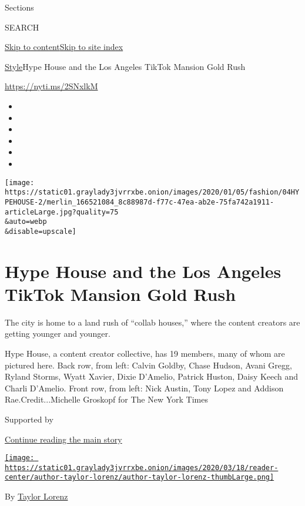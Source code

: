 Sections

SEARCH

\protect\hyperlink{site-content}{Skip to
content}\protect\hyperlink{site-index}{Skip to site index}

\href{/section/style}{Style}\textbar{}Hype House and the Los Angeles
TikTok Mansion Gold Rush

\href{https://nyti.ms/2SNxlkM}{https://nyti.ms/2SNxlkM}

\begin{itemize}
\item
\item
\item
\item
\item
\item
\end{itemize}

\texttt{[image: https://static01.graylady3jvrrxbe.onion/images/2020/01/05/fashion/04HYPEHOUSE-2/merlin\_166521084\_8c88987d-f77c-47ea-ab2e-75fa742a1911-articleLarge.jpg?quality=75\\\&auto=webp\\\&disable=upscale]}

\hypertarget{hype-house-and-the-los-angeles-tiktok-mansion-gold-rush}{%
\section{Hype House and the Los Angeles TikTok Mansion Gold
Rush}\label{hype-house-and-the-los-angeles-tiktok-mansion-gold-rush}}

The city is home to a land rush of ``collab houses,'' where the content
creators are getting younger and younger.

Hype House, a content creator collective, has 19 members, many of whom
are pictured here. Back row, from left: Calvin Goldby, Chase Hudson,
Avani Gregg, Ryland Storms, Wyatt Xavier, Dixie D'Amelio, Patrick
Huston, Daisy Keech and Charli D'Amelio. Front row, from left: Nick
Austin, Tony Lopez and Addison Rae.Credit...Michelle Groskopf for The
New York Times

Supported by

\protect\hyperlink{after-sponsor}{Continue reading the main story}

\href{https://www.nytimes3xbfgragh.onion/by/taylor-lorenz}{\texttt{[image: https://static01.graylady3jvrrxbe.onion/images/2020/03/18/reader-center/author-taylor-lorenz/author-taylor-lorenz-thumbLarge.png]}}

By \href{https://www.nytimes3xbfgragh.onion/by/taylor-lorenz}{Taylor
Lorenz}

